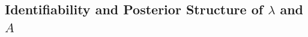 \subsection{Identifiability and Posterior Structure of \texorpdfstring{$\lambda$}{lambda} and \texorpdfstring{$A$}{A}}















